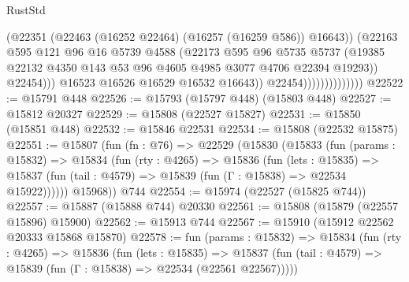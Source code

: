 \begin{lexlean}{RustStd}
\begin{coremodule}
                                        (@22351
                                          (@22463 (@16252 @22464) (@16257 (@16259 @586)) @16643))
                                        (@22163
                                          @595
                                          @121
                                          @96
                                          @16
                                          @5739
                                          @4588
                                          (@22173
                                            @595
                                            @96
                                            @5735
                                            @5737
                                            (@19385
                                              @22132
                                              @4350
                                              @143
                                              @53
                                              @96
                                              @4605
                                              @4985
                                              @3077
                                              @4706
                                              @22394
                                              @19293))
                                          @22454)))
                                    @16523
                                    @16526
                                    @16529
                                    @16532
                                    @16643))
                                @22454))))))))))))))
@22522 := @15791 @448
@22526 := @15793 (@15797 @448) (@15803 @448)
@22527 := @15812 @20327
@22529 := @15808 (@22527 @15827)
@22531 := @15850 (@15851 @448)
@22532 := @15846 @22531
@22534 := @15808 (@22532 @15875)
@22551 := @15807
    (fun (fn : @76) =>
    @22529
      (@15830
        (@15833
          (fun (params : @15832) =>
          @15834
            (fun (rty : @4265) =>
            @15836
              (fun (lets : @15835) =>
              @15837 (fun (tail : @4579) => @15839 (fun (Γ : @15838) => @22534 @15922))))))
        @15968))
    @744
@22554 := @15974 (@22527 (@15825 @744))
@22557 := @15887 (@15888 @744) @20330
@22561 := @15808 (@15879 (@22557 @15896) @15900)
@22562 := @15913 @744
@22567 := @15910 (@15912 @22562 @20333 @15868 @15870)
@22578 := fun (params : @15832) =>
  @15834
    (fun (rty : @4265) =>
    @15836
      (fun (lets : @15835) =>
      @15837 (fun (tail : @4579) => @15839 (fun (Γ : @15838) => @22534 (@22561 @22567)))))

\end{coremodule}
\end{lexlean}
